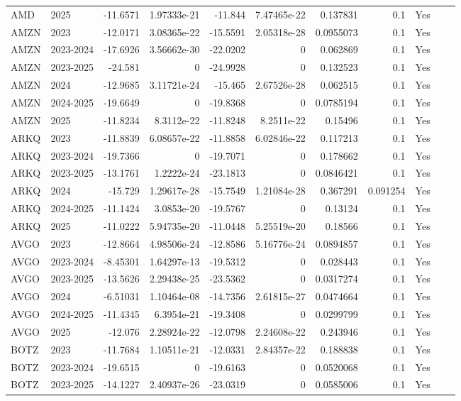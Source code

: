 \begin{longtable}{llrrrrrrrrl}
AMD & 2025 & -11.6571 & 1.97333e-21 & -11.844 & 7.47465e-22 & 0.137831 & 0.1 & Yes \\
AMZN & 2023 & -12.0171 & 3.08365e-22 & -15.5591 & 2.05318e-28 & 0.0955073 & 0.1 & Yes \\
AMZN & 2023-2024 & -17.6926 & 3.56662e-30 & -22.0202 & 0 & 0.062869 & 0.1 & Yes \\
AMZN & 2023-2025 & -24.581 & 0 & -24.9928 & 0 & 0.132523 & 0.1 & Yes \\
AMZN & 2024 & -12.9685 & 3.11721e-24 & -15.465 & 2.67526e-28 & 0.062515 & 0.1 & Yes \\
AMZN & 2024-2025 & -19.6649 & 0 & -19.8368 & 0 & 0.0785194 & 0.1 & Yes \\
AMZN & 2025 & -11.8234 & 8.3112e-22 & -11.8248 & 8.2511e-22 & 0.15496 & 0.1 & Yes \\
ARKQ & 2023 & -11.8839 & 6.08657e-22 & -11.8858 & 6.02846e-22 & 0.117213 & 0.1 & Yes \\
ARKQ & 2023-2024 & -19.7366 & 0 & -19.7071 & 0 & 0.178662 & 0.1 & Yes \\
ARKQ & 2023-2025 & -13.1761 & 1.2222e-24 & -23.1813 & 0 & 0.0846421 & 0.1 & Yes \\
ARKQ & 2024 & -15.729 & 1.29617e-28 & -15.7549 & 1.21084e-28 & 0.367291 & 0.091254 & Yes \\
ARKQ & 2024-2025 & -11.1424 & 3.0853e-20 & -19.5767 & 0 & 0.13124 & 0.1 & Yes \\
ARKQ & 2025 & -11.0222 & 5.94735e-20 & -11.0448 & 5.25519e-20 & 0.18566 & 0.1 & Yes \\
AVGO & 2023 & -12.8664 & 4.98506e-24 & -12.8586 & 5.16776e-24 & 0.0894857 & 0.1 & Yes \\
AVGO & 2023-2024 & -8.45301 & 1.64297e-13 & -19.5312 & 0 & 0.028443 & 0.1 & Yes \\
AVGO & 2023-2025 & -13.5626 & 2.29438e-25 & -23.5362 & 0 & 0.0317274 & 0.1 & Yes \\
AVGO & 2024 & -6.51031 & 1.10464e-08 & -14.7356 & 2.61815e-27 & 0.0474664 & 0.1 & Yes \\
AVGO & 2024-2025 & -11.4345 & 6.3954e-21 & -19.3408 & 0 & 0.0299799 & 0.1 & Yes \\
AVGO & 2025 & -12.076 & 2.28924e-22 & -12.0798 & 2.24608e-22 & 0.243946 & 0.1 & Yes \\
BOTZ & 2023 & -11.7684 & 1.10511e-21 & -12.0331 & 2.84357e-22 & 0.188838 & 0.1 & Yes \\
BOTZ & 2023-2024 & -19.6515 & 0 & -19.6163 & 0 & 0.0520068 & 0.1 & Yes \\
BOTZ & 2023-2025 & -14.1227 & 2.40937e-26 & -23.0319 & 0 & 0.0585006 & 0.1 & Yes \\

\end{longtable}
